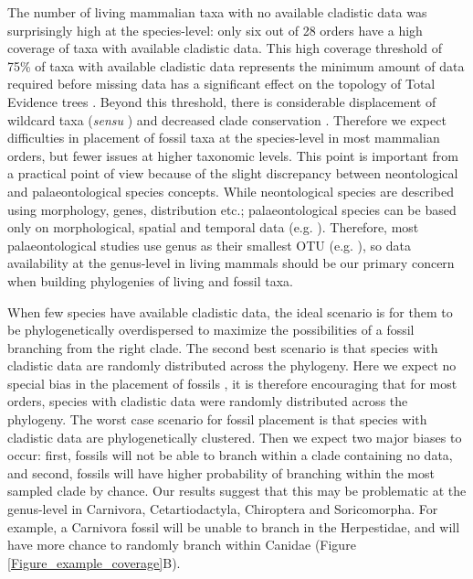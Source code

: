 \documentclass[12pt,letterpaper]{article}
\begin{document}
The number of living mammalian taxa with no available cladistic data was surprisingly high at the species-level: only six out of 28 orders have a high coverage of taxa with available cladistic data.
This high coverage threshold of 75\% of taxa with available cladistic data represents the minimum amount of data required before missing data has a significant effect on the topology of Total Evidence trees \cite{GuillermeCooper}.
Beyond this threshold, there is considerable displacement of wildcard taxa (\textit{sensu} \cite{kearneyfragmentary2002}) and decreased clade conservation \cite{GuillermeCooper}.
Therefore we expect difficulties in placement of fossil taxa at the species-level in most mammalian orders, but fewer issues at higher taxonomic levels.
This point is important from a practical point of view because of the slight discrepancy between neontological and palaeontological species concepts.
While neontological species are described using morphology, genes, distribution etc.; palaeontological species can be based only on morphological, spatial and temporal data (e.g. \cite{ni2013oldest}).
Therefore, most palaeontological studies use genus as their smallest OTU (e.g. \cite{ni2013oldest,O'Leary08022013}), so data availability at the genus-level in living mammals should be our primary concern when building phylogenies of living and fossil taxa.

When few species have available cladistic data, the ideal scenario is for them to be phylogenetically overdispersed to maximize the possibilities of a fossil branching from the right clade.
The second best scenario is that species with cladistic data are randomly distributed across the phylogeny. 
Here we expect no special bias in the placement of fossils \cite{GuillermeCooper}, it is therefore encouraging that for most orders, species with cladistic data were randomly distributed across the phylogeny.
The worst case scenario for fossil placement is that species with cladistic data are phylogenetically clustered. 
Then we expect two major biases to occur: first, fossils will not be able to branch within a clade containing no data, and second, fossils will have higher probability of branching within the most sampled clade by chance. 
Our results suggest that this may be problematic at the genus-level in Carnivora, Cetartiodactyla, Chiroptera and Soricomorpha. 
For example, a Carnivora fossil will be unable to branch in the Herpestidae, and will have more chance to randomly branch within Canidae (Figure \ref{Figure_example_coverage}B).
\end{document}
